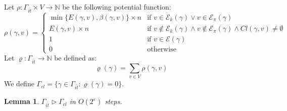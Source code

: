 \documentclass[a4paper, 12pt]{article}
\newtheorem{lemma}[theorem]{Lemma}
\begin{document}
Let $\rho : \Gamma_{\bar{it}} \times V \rightarrow \mathbb{N}$ be the 
following potential function:
\begin{equation}
    \rho(\gamma, v) =
    \begin{cases}
        \min\{E(\gamma,v), \beta(\gamma,v)\} \times n & 
            \text{if } v \in \mathcal{E}_k(\gamma) \vee 
            v \in \mathcal{E}_\pi(\gamma) \\
        E(\gamma,v) \times n & 
            \text{if } v \notin \mathcal{E}_k(\gamma) \wedge 
            v \notin \mathcal{E}_\pi(\gamma) \wedge 
            Cl(\gamma,v) \neq \emptyset \\
        1 & \text{if } v \in \mathcal{E}(\gamma) \\
        0 & \text{otherwise}
    \end{cases}
\end{equation}
Let $\varrho : \Gamma_{\bar{it}} \rightarrow \mathbb{N}$ be defined as:
$$\varrho(\gamma) = \sum_{v \in V} \rho(\gamma, v)$$
We define $\Gamma_{cl} = \{\gamma \in \Gamma_{\bar{it}} : \varrho(\gamma) = 0\}$.

\begin{lemma}
\label{lem:Clean}
$\Gamma_{\bar{it}} \triangleright \Gamma_{cl}$ in $O(2^\varepsilon)$ steps.
\end{lemma}
\end{document}
